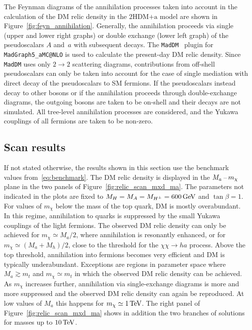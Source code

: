 \documentclass[a4paper, 11pt,notoc]{article}
\newcommand{\mA}{\ensuremath{M_{A}}\xspace}
\newcommand{\ma}{\ensuremath{M_{a}}\xspace}
\newcommand{\mH}{\ensuremath{M_{H}}\xspace}
\newcommand{\mHc}{\ensuremath{M_{H^{\pm}}}\xspace}
\newcommand{\mh}{\ensuremath{M_{h}}\xspace}
\newcommand{\hdma}{\ensuremath{\textrm{2HDM+a}}\xspace}
\begin{document}
The Feynman diagrams of the annihilation processes taken into account in the calculation of the DM relic density in the \hdma model are shown in Figure~\ref{fig:feyn_annihilation}. Generally, the annihilation proceeds via single (upper and lower right graphs) or double exchange (lower left graph) of the pseudoscalars  $A$ and~$a$ with subsequent decays. The {\tt MadDM}~\cite{Backovic:2013dpa,Backovic:2015cra} plugin for {\tt MadGraph5\_aMC@NLO} is used to calculate the present-day DM relic density.  Since {\tt MadDM} uses only $2 \to 2$ scattering diagrams, contributions from off-shell pseudoscalars can only be taken into account for the case of single mediation with direct decay of the pseudoscalars to SM fermions. If the pseudoscalars instead decay to other bosons or if the annihilation proceeds through double-exchange diagrams, the outgoing bosons are taken to be on-shell and their decays are not simulated. All tree-level annihilation processes are considered, and the Yukawa couplings of all fermions are taken to be non-zero.

\subsection{Scan results}

 If not stated otherwise, the results shown in this section use the benchmark values from~\eqref{eq:benchmark}. The DM relic density is displayed in the $\ma \hspace{0.5mm}$--$\hspace{0.5mm} m_\chi$ plane in the two panels of Figure~\ref{fig:relic_scan_mxd_ma}. The parameters not indicated in the plots are  fixed to  $\mH=\mA=\mHc= 600 \, {\rm GeV}$ and $\tan \beta=1$. For values of $m_\chi$ below the mass of the top quark, DM is mostly overabundant. In this regime, annihilation to quarks is suppressed by the small Yukawa couplings of the light fermions. The observed DM relic density can only be achieved for $m_\chi \simeq \ma/2$, where annihilation is resonantly enhanced, or for $m_\chi \simeq (\ma+\mh)/2$, close to the threshold for the $\chi\chi \to h a$ process.  Above the top threshold, annihilation into fermions becomes very efficient and DM is typically underabundant. Exceptions are regions in parameter space where $M_a \gtrsim m_t$ and $m_\chi \simeq m_t$ in which the observed DM relic density can be achieved.  As $m_\chi$ increases further, annihilation via single-exchange diagrams is more and more suppressed and the observed DM relic density can again be reproduced.  At low values of $\ma$ this happens for $m_\chi \simeq 1 \, {\rm TeV}$. The right panel of Figure~\ref{fig:relic_scan_mxd_ma}   shows in addition the two branches of solutions for masses up to $10 \, {\rm TeV}$. 
\end{document}
